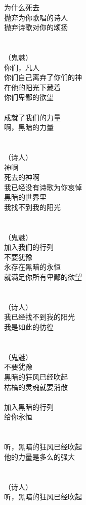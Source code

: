 为什么死去\\
抛弃为你歌唱的诗人\\
抛弃诗歌对你的颂扬\\
\\
\\
（鬼魅）\\
你们，凡人\\
你们自己离弃了你们的神\\
在他的阳光下藏着\\
你们卑鄙的欲望\\
\\
成就了我们的力量\\
啊，黑暗的力量\\
\\
\\
（诗人）\\
神啊\\
死去的神啊\\
我已经没有诗歌为你哀悼\\
黑暗的世界里\\
我找不到我的阳光\\
\\
\\
（鬼魅）\\
加入我们的行列\\
不要犹豫\\
永存在黑暗的永恒\\
就满足你所有卑鄙的欲望\\
\\
\\
（诗人）\\
我已经找不到我的阳光\\
我是如此的彷徨\\
\\
\\
（鬼魅）\\
不要犹豫\\
黑暗的狂风已经吹起\\
枯槁的灵魂就要消散\\
\\
加入黑暗的行列\\
给你永恒\\
\\
\\
听，黑暗的狂风已经吹起\\
他的力量是多么的强大\\
\\
\\
（诗人）\\
听，黑暗的狂风已经吹起\\
